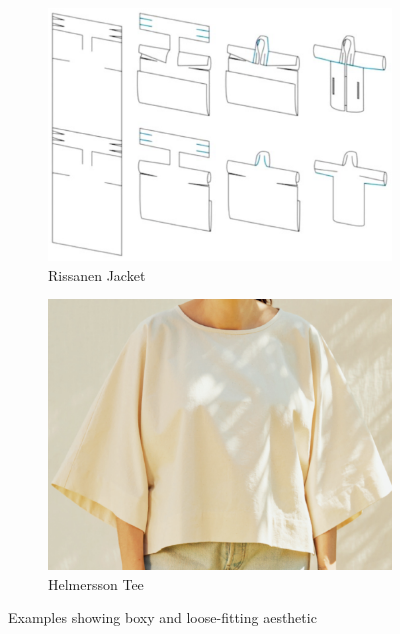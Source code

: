 \begin{figure} [H]
    \centering
    \begin{subfigure}[b]{0.55\textwidth}
        \centering
        \includegraphics[width=\textwidth]{Images/rissanen jacket.png}
        \caption{Rissanen Jacket}
        \label{fig:rissanen_jacket}
    \end{subfigure}
    \hfill
    \begin{subfigure}[b]{0.4\textwidth}
        \centering
        \includegraphics[width=\textwidth]{Images/bh tee.png}
        \caption{Helmersson Tee}
        \label{fig:bh_tee}
    \end{subfigure}
    \caption{Examples showing boxy and loose-fitting aesthetic}
    \label{fig:jacket_tee}
\end{figure}

